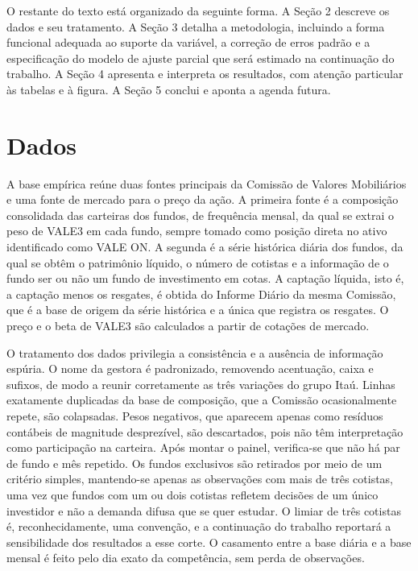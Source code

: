 \documentclass[12pt,a4paper]{article}
\begin{document}
O restante do texto está organizado da seguinte forma. A Seção 2 descreve os dados e seu
tratamento. A Seção 3 detalha a metodologia, incluindo a forma funcional adequada ao suporte da
variável, a correção de erros padrão e a especificação do modelo de ajuste parcial que será
estimado na continuação do trabalho. A Seção 4 apresenta e interpreta os resultados, com
atenção particular às tabelas e à figura. A Seção 5 conclui e aponta a agenda futura.

\section{Dados}

A base empírica reúne duas fontes principais da Comissão de Valores Mobiliários e uma fonte de
mercado para o preço da ação. A primeira fonte é a composição consolidada das carteiras dos
fundos, de frequência mensal, da qual se extrai o peso de VALE3 em cada fundo, sempre tomado
como posição direta no ativo identificado como VALE ON. A segunda é a série histórica diária
dos fundos, da qual se obtêm o patrimônio líquido, o número de cotistas e a informação de o
fundo ser ou não um fundo de investimento em cotas. A captação líquida, isto é, a captação
menos os resgates, é obtida do Informe Diário da mesma Comissão, que é a base de origem da série
histórica e a única que registra os resgates. O preço e o beta de VALE3 são calculados a partir
de cotações de mercado.

O tratamento dos dados privilegia a consistência e a ausência de informação espúria. O nome da
gestora é padronizado, removendo acentuação, caixa e sufixos, de modo a reunir corretamente as
três variações do grupo Itaú. Linhas exatamente duplicadas da base de composição, que a
Comissão ocasionalmente repete, são colapsadas. Pesos negativos, que aparecem apenas como
resíduos contábeis de magnitude desprezível, são descartados, pois não têm interpretação como
participação na carteira. Após montar o painel, verifica-se que não há par de fundo e mês
repetido. Os fundos exclusivos são retirados por meio de um critério simples, mantendo-se apenas
as observações com mais de três cotistas, uma vez que fundos com um ou dois cotistas refletem
decisões de um único investidor e não a demanda difusa que se quer estudar. O limiar de três
cotistas é, reconhecidamente, uma convenção, e a continuação do trabalho reportará a
sensibilidade dos resultados a esse corte. O casamento entre a base diária e a base mensal é
feito pelo dia exato da competência, sem perda de observações.
\end{document}
